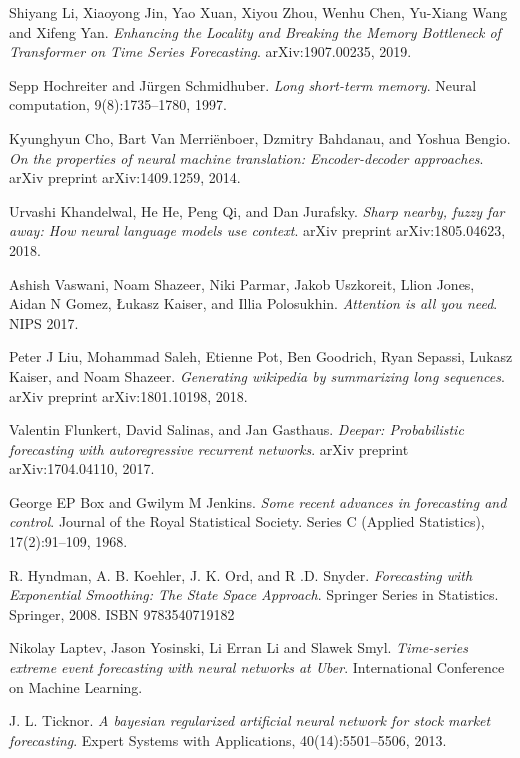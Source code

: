 \documentclass[en]{pracamgr}
\begin{document}
\begin{thebibliography}{99}

 Shiyang Li, Xiaoyong Jin, Yao Xuan, Xiyou Zhou, Wenhu Chen, Yu-Xiang Wang and Xifeng Yan. \textit{Enhancing the Locality and Breaking the Memory
	Bottleneck of Transformer on Time Series Forecasting}. arXiv:1907.00235, 2019.

 Sepp Hochreiter and Jürgen Schmidhuber. \textit{Long short-term memory}. Neural computation, 9(8):1735–1780, 1997.

 Kyunghyun Cho, Bart Van Merriënboer, Dzmitry Bahdanau, and Yoshua Bengio. \textit{On the properties of neural machine translation: Encoder-decoder approaches}. arXiv preprint arXiv:1409.1259, 2014.

 Urvashi Khandelwal, He He, Peng Qi, and Dan Jurafsky. \textit{Sharp nearby, fuzzy far away: How neural language models use context}. arXiv preprint arXiv:1805.04623, 2018.

 Ashish Vaswani, Noam Shazeer, Niki Parmar, Jakob Uszkoreit, Llion Jones, Aidan N Gomez, Łukasz
Kaiser, and Illia Polosukhin. \textit{Attention is all you need}. NIPS 2017.

 Peter J Liu, Mohammad Saleh, Etienne Pot, Ben Goodrich, Ryan Sepassi, Lukasz Kaiser, and Noam
Shazeer. \textit{Generating wikipedia by summarizing long sequences}. arXiv preprint arXiv:1801.10198, 2018.

 Valentin Flunkert, David Salinas, and Jan Gasthaus. \textit{Deepar: Probabilistic forecasting with autoregressive recurrent networks}. arXiv preprint arXiv:1704.04110, 2017.

 George EP Box and Gwilym M Jenkins. \textit{Some recent advances in forecasting and control}. Journal of the
Royal Statistical Society. Series C (Applied Statistics), 17(2):91–109, 1968.

 R. Hyndman, A. B. Koehler, J. K. Ord, and R .D. Snyder. \textit{Forecasting with Exponential Smoothing: The State Space Approach}. Springer Series in Statistics. Springer, 2008. ISBN
9783540719182

 Nikolay Laptev, Jason Yosinski, Li Erran Li and Slawek Smyl. \textit{Time-series extreme event forecasting with neural networks at Uber}. International Conference on Machine Learning.

 J. L. Ticknor. \textit{A bayesian regularized artificial neural network for stock market forecasting}. Expert Systems with Applications, 40(14):5501–5506, 2013.


\end{thebibliography}
\end{document}
